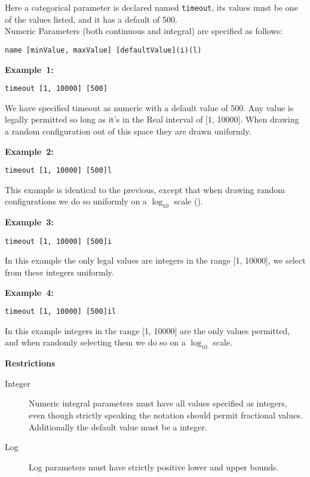 \documentclass[manual.tex]{subfiles}
\begin{document}
Here a categorical parameter is declared named \texttt{timeout}, its values
must be one of the values listed, and it has a default of 500.\\
\vspace{5pt}
Numeric Parameters (both continuous and integral) are specified as follows:

\texttt{name~{[}minValue,~maxValue{]}~{[}defaultValue{]}(i)(l)}

\vspace{5pt}
\textbf{Example~1:}
\vspace{2pt}

\texttt{timeout~{[}1, 10000{]}~{[}500{]}}

We have specified timeout as numeric with a default
value of 500. Any value is legally permitted so long as it's in the
Real interval of {[}1, 10000{]}. When drawing a random configuration out of
this space they are drawn uniformly.

\vspace{5pt}
\textbf{Example~2:}
\vspace{2pt}

\texttt{timeout~{[}1, 10000{]}~{[}500{]}l}

This example is identical to the previous, except that when drawing random configurations we do so uniformly on a $\log_{10}$ scale ().

\vspace{5pt}
\textbf{Example~3:}
\vspace{2pt}

\texttt{timeout~{[}1, 10000{]}~{[}500{]}i}

In this example the only legal values are integers in the range {[}1, 10000{]}, we select from these integers uniformly.

\vspace{5pt}
\textbf{Example~4:}
\vspace{2pt}

\texttt{timeout~{[}1, 10000{]}~{[}500{]}il}

In this example integers in the range {[}1, 10000{]} are
the only values permitted, and when randomly selecting them we do
so on a $\log_{10}$ scale.

\vspace{5pt}
\textbf{Restrictions}

\begin{description} 

\item[Integer] Numeric integral parameters must have all values specified as integers, even though strictly speaking the notation should permit fractional values. Additionally the default value must be a integer.

\item[Log] Log parameters must have strictly positive lower and upper bounds.

\end{description}
\end{document}

